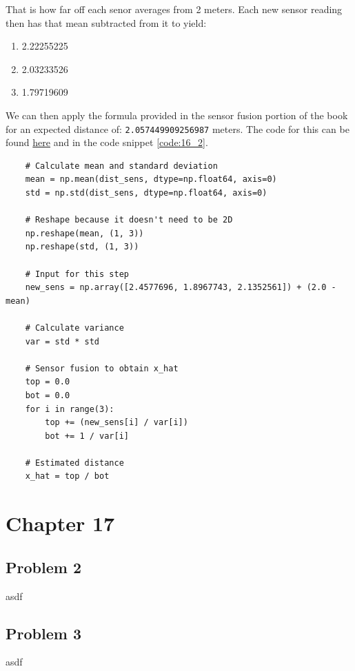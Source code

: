 \documentclass{article}
\begin{document}
That is how far off each senor averages from 2 meters. Each new sensor reading 
then has that mean subtracted from it to yield:

\begin{enumerate}[label=\Alph*]
    \item 2.22255225
    \item 2.03233526
    \item 1.79719609
\end{enumerate}

We can then apply the formula provided in the sensor fusion portion of the book 
for an expected distance of: \texttt{2.057449909256987} meters. The code for 
this can be found 
\href{https://github.com/macattackftw/RoboticsHW/blob/master/HW5/problem16_2_data.py}{here} 
and in the code snippet \ref{code:16_2}.

\begin{code}
\label{code:16_2}
\begin{verbatim}
    # Calculate mean and standard deviation
    mean = np.mean(dist_sens, dtype=np.float64, axis=0)
    std = np.std(dist_sens, dtype=np.float64, axis=0)

    # Reshape because it doesn't need to be 2D
    np.reshape(mean, (1, 3))
    np.reshape(std, (1, 3))

    # Input for this step
    new_sens = np.array([2.4577696, 1.8967743, 2.1352561]) + (2.0 - mean)

    # Calculate variance
    var = std * std

    # Sensor fusion to obtain x_hat
    top = 0.0
    bot = 0.0
    for i in range(3):
        top += (new_sens[i] / var[i])
        bot += 1 / var[i]

    # Estimated distance
    x_hat = top / bot
\end{verbatim}
\end{code}


\newpage
\section{\textbf{Chapter 17}}
\subsection{Problem 2}
asdf


\subsection{Problem 3}
asdf
\end{document}
